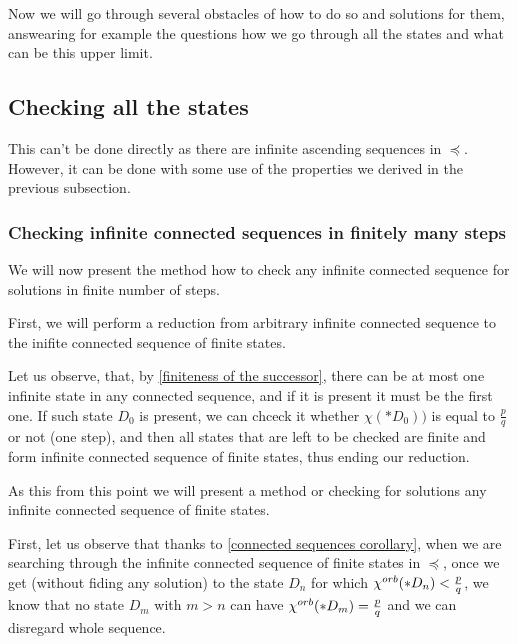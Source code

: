Now we will go through several obstacles of how to do so and solutions for them, answearing for 
example the 
questions how we go through all the states and what can be this upper limit. 


\subsection{Checking all the states}
This can't be done directly as there are infinite ascending sequences in $\preceq$. 
However, it can be done with some use of the properties we derived in the previous subsection.
\subsubsection{Checking infinite connected sequences in finitely many steps}
We will now present the method how to check any infinite connected sequence for solutions 
in finite number of steps.


First, we will perform a reduction from 
arbitrary infinite connected sequence to the inifite connected sequence of finite states. 

Let us observe, that, by \ref{finiteness of the successor}, 
there can be at most one infinite state in 
any connected sequence, and if it is present it must be the first one. If such state 
$D_0$ is present, 
we can chceck it whether $\chi(*D_0))$ is equal to $\frac{p}{q}$ or not (one step), 
and then all states that are left to be checked are finite and form infinite 
connected sequence of finite states, thus ending our reduction. 

As this from this point we will present a method or checking for solutions any 
infinite connected sequence of finite states.

First, let us observe that thanks to \ref{connected sequences corollary}, 
when we are searching through the infinite connected sequence of finite states in 
$\preceq$, once we get (without fiding any solution) 
to the state $D_n$ for which ${\chi^{orb}(*D_n)} < \frac{p}{q}$, we know 
that no state $D_m$ with $m>n$ can have ${\chi^{orb}(*D_m)} = \frac{p}{q}$ 
and we can disregard whole sequence. 

